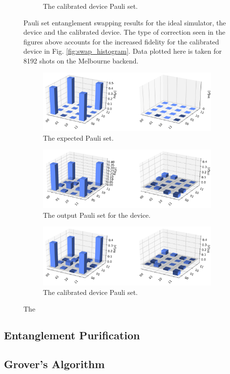 \begin{figure}
\begin{subfigure}{.5\textwidth}
		\caption{The calibrated device Pauli set.}
		\label{fig:swap_pauli_dev}
	\end{subfigure}
	\caption{ Pauli set entanglement swapping results for the ideal simulator, the device and the calibrated device. The type of correction seen in the figures above accounts for the increased fidelity for the calibrated device in Fig.
		\ref{fig:swap_histogram}. Data plotted here is taken for 8192 shots on the Melbourne backend.}
	\label{fig:swap_paulis}
\end{figure}

\begin{figure}
	\begin{subfigure}{.5\textwidth} \centering %
		\includegraphics[width=.8\linewidth]{images/results/swap_density_sim.png}
		\caption{The expected Pauli set.}
		\label{fig:swap_density_sim}
	\end{subfigure} \newline
	\begin{subfigure}{.5\textwidth} \centering %
		\includegraphics[width=.8\linewidth]{images/results/swap_density_dev.png}
		\caption{The output Pauli set for the device.}
		\label{fig:swap_density_dev}
	\end{subfigure} \newline
	\begin{subfigure}{.5\textwidth} \centering %
		\includegraphics[width=.8\linewidth]{images/results/swap_density_cal.png}
		\caption{The calibrated device Pauli set.}
		\label{fig:swap_density_dev}
	\end{subfigure}
	\caption{ The }
	\label{fig:swap_density}
\end{figure}

\subsection{Entanglement Purification}
\subsection{Grover's Algorithm}


